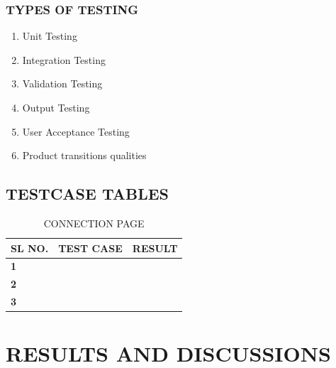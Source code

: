 \documentclass[12pt]{report} %
\begin{document}
\subsection{TYPES OF TESTING}
\label{subsec:TYPES OF TESTING}

\begin{enumerate}
	\item Unit Testing 
	\item Integration Testing
	\item Validation Testing 
	\item Output Testing 
	\item User Acceptance Testing 
	\item Product transitions qualities 
\end{enumerate}

\section{TESTCASE TABLES}
\label{sec:TESTCASE TABLES}

\begin{table}[h]
	\centering
	\caption{CONNECTION PAGE}
	\label{tab:CONNECTION PAGE}
	\begin{tabular}{|l|l|l|}
		\hline
		\textbf{SL NO.} & \textbf{TEST CASE} & \textbf{RESULT} \\ \hline
		\textbf{1}      & \textbf{}          & \textbf{}       \\ \hline
		\textbf{2}      & \textbf{}          & \textbf{}       \\ \hline
		\textbf{3}      & \textbf{}          & \textbf{}       \\ \hline
	\end{tabular}
\end{table}


\chapter{RESULTS AND DISCUSSIONS}
\end{document}

